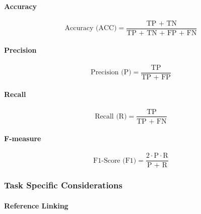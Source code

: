 \paragraph{Accuracy}

\begin{equation*}
\text{Accuracy (ACC)} = \frac{\text{TP + TN}}{\text{TP + TN + FP + FN}}
\end{equation*}

\paragraph{Precision}

\begin{equation*}
\text{Precision (P)} = \frac{\text{TP}}{\text{TP + FP}}
\end{equation*}


\paragraph{Recall}

\begin{equation*}
\text{Recall (R)} = \frac{\text{TP}}{\text{TP + FN}}
\end{equation*}

\paragraph{F-measure}

\begin{equation*}
\text{F1-Score (F1)} = \frac{2 \cdot \text{P} \cdot \text{R}}{\text{P + R}}
\end{equation*}


\subsubsection{Task Specific Considerations}

\paragraph{Reference Linking}

